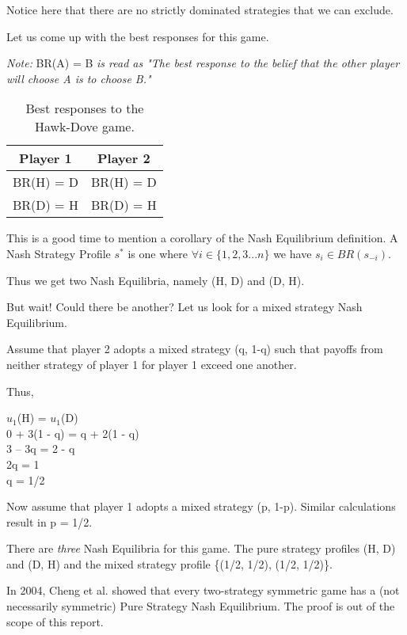 \documentclass[11pt]{article}
\theoremstyle{definition}
\begin{document}
Notice here that there are no strictly dominated strategies that we can exclude.

Let us come up with the best responses for this game.

\textit{Note: }BR(A) = B \textit{is read as "The best response to the belief that the other player will choose A is to choose B."}

\begin{table}[h!]
\centering
\begin{tabular}{|c|c|}
\hline
Player 1 & Player 2 \\
\hline
BR(H) = D & BR(H) = D \\
\hline
BR(D) = H & BR(D) = H\\
\hline
\end{tabular}
\caption{Best responses to the Hawk-Dove game.}
\label{table:hdbr}
\end{table}

This is a good time to mention a corollary of the Nash Equilibrium definition. A Nash Strategy Profile $s^*$ is one where $\forall i \in \{1, 2, 3 ... n\}$ we have $s_i \in BR(s_{-i})$.

Thus we get two Nash Equilibria, namely (H, D) and (D, H). 

But wait! Could there be another? Let us look for a mixed strategy Nash Equilibrium.

Assume that player 2 adopts a mixed strategy (q, 1-q) such that payoffs from neither strategy of player 1 for player 1 exceed one another. 

Thus,

\begin{center}
$u_1$(H) = $u_1$(D)\\
0 + 3(1 - q) = q + 2(1 - q)\\
3 – 3q = 2 - q\\
2q = 1\\
q = 1/2\\
\end{center}

Now assume that player 1 adopts a mixed strategy (p, 1-p). Similar calculations result in p = 1/2.

There are \textit{three} Nash Equilibria for this game. The pure strategy profiles (H, D) and (D, H) and the mixed strategy profile \{(1/2, 1/2), (1/2, 1/2)\}.


In 2004, Cheng et al. showed that every two-strategy symmetric game has a (not necessarily symmetric) Pure Strategy Nash Equilibrium. The proof is out of the scope of this report.
\end{document}
